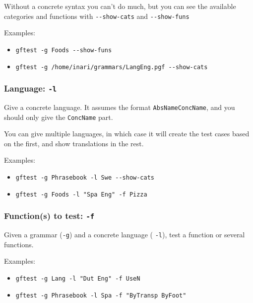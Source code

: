 Without a concrete syntax you can't do much, but you can see the
available categories and functions with \texttt{-\/-show-cats} and
\texttt{-\/-show-funs}

Examples:

\begin{itemize}
\tightlist
\item
  \texttt{gftest\ -g\ Foods\ -\/-show-funs}
\item
  \texttt{gftest\ -g\ /home/inari/grammars/LangEng.pgf\ -\/-show-cats}
\end{itemize}

\hypertarget{language--l}{%
\subsubsection{\texorpdfstring{Language:
\texttt{-l}}{Language: -l}}\label{language--l}}

Give a concrete language. It assumes the format
\texttt{AbsNameConcName}, and you should only give the \texttt{ConcName}
part.

You can give multiple languages, in which case it will create the test
cases based on the first, and show translations in the rest.

Examples:

\begin{itemize}
\tightlist
\item
  \texttt{gftest\ -g\ Phrasebook\ -l\ Swe\ -\/-show-cats}~\\
\item
  \texttt{gftest\ -g\ Foods\ -l\ "Spa\ Eng"\ -f\ Pizza}
\end{itemize}

\hypertarget{functions-to-test--f}{%
\subsubsection{\texorpdfstring{Function(s) to test:
\texttt{-f}}{Function(s) to test: -f}}\label{functions-to-test--f}}

Given a grammar (\texttt{-g}) and a concrete language ( \texttt{-l}),
test a function or several functions.

Examples:

\begin{itemize}
\tightlist
\item
  \texttt{gftest\ -g\ Lang\ -l\ "Dut\ Eng"\ -f\ UseN}
\item
  \texttt{gftest\ -g\ Phrasebook\ -l\ Spa\ -f\ "ByTransp\ ByFoot"}
\end{itemize}

